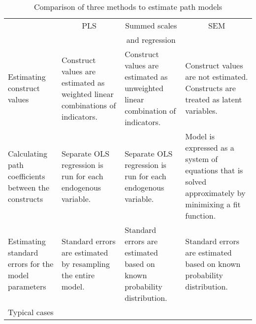 \documentclass[10pt]{a0poster}
\begin{document}
\begin{table}[ht]
\begin{center}
\caption{Comparison of three methods to estimate path models}
\begin{tabular}{p{}p{}p{}p{}}
\toprule
&\multicolumn{1}{c}{PLS}&\multicolumn{1}{c}{Summed scales}&\multicolumn{1}{c}{SEM}\\
&&\multicolumn{1}{c}{and regression}\\
\midrule
Estimating construct values&Construct values are estimated as weighted linear combinations of indicators.&Construct values are estimated as unweighted linear combination of indicators.&Construct values are not estimated. Constructs are treated as latent variables. \\ \noalign{\smallskip}
Calculating path coefficients between the constructs&Separate OLS regression is run for each endogenous variable.&Separate OLS regression is run for each endogenous variable.& Model is expressed as a system of equations that is solved approximately by minimixing a fit function. \\ \noalign{\smallskip}
Estimating standard errors for the model parameters&Standard errors are estimated by resampling the entire model.&Standard errors are estimated based on known probability distribution.&Standard errors are estimated based on known probability distribution. \\ 
\bottomrule
\footnotesize{Typical cases}\\
\end{tabular}
\end{center}
\end{table}


\end{document}
